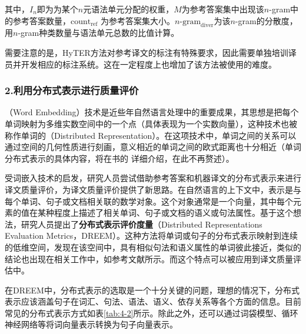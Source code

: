 \noindent 其中，${I}_n$即为为某个$n$元语法单元分配的权重，$M$为参考答案集中出现该$n$-gram中的参考答案数量，$\textrm{count}_{\textrm{ref}}$ 为参考答案集大小。$n\textrm{-gram}_{\textrm{diver}}$为该$n$-gram的分散度，用$n$-gram种类数量与语法单元总数的比值计算。

\parinterval 需要注意的是，HyTER方法对参考译文的标注有特殊要求，因此需要单独培训译员并开发相应的标注系统。这在一定程度上也增加了该方法被使用的难度。


\subsubsection{2.利用分布式表示进行质量评价}

（Word Embedding）技术是近些年自然语言处理中的重要成果，其思想是把每个单词映射为多维实数空间中的一个点（具体表现为一个实数向量），这种技术也被称作单词的{\small{}}（Distributed Representation）。在这项技术中，单词之间的关系可以通过空间的几何性质进行刻画，意义相近的单词之间的欧式距离也十分相近（单词分布式表示的具体内容，将在书的{\chapternine} 详细介绍，在此不再赘述）。

\parinterval 受词嵌入技术的启发，研究人员尝试借助参考答案和机器译文的分布式表示来进行译文质量评价，为译文质量评价提供了新思路。在自然语言的上下文中，表示是与每个单词、句子或文档相关联的数学对象。这个对象通常是一个向量，其中每个元素的值在某种程度上描述了相关单词、句子或文档的语义或句法属性。基于这个想法，研究人员提出了{\small\sffamily\bfseries{分布式表示评价度量}}（Distributed Representations Evaluation Metrics，DREEM）。这种方法将单词或句子的分布式表示映射到连续的低维空间，发现在该空间中，具有相似句法和语义属性的单词彼此接近，类似的结论也出现在相关工作中，如参考文献\cite{bengio2003a,DBLP:conf/emnlp/SocherPHNM11,DBLP:conf/emnlp/SocherPWCMNP13}所示。而这个特点可以被应用到译文质量评估中。

\parinterval 在DREEM中，分布式表示的选取是一个十分关键的问题，理想的情况下，分布式表示应该涵盖句子在词汇、句法、语法、语义、依存关系等各个方面的信息。目前常见的分布式表示方式如表\ref{tab:4-2}所示。除此之外，还可以通过词袋模型、循环神经网络等将词向量表示转换为句子向量表示。

